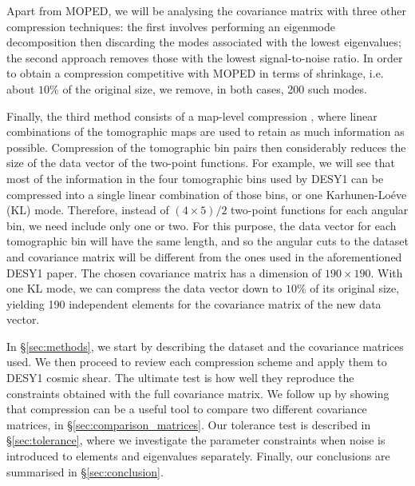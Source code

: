 \documentclass[twocolumn,nofootinbib]{\docclass}
\newcommand{\rsec}[1]{\S\ref{sec:#1}}
\begin{document}
	Apart from MOPED, we will be analysing the covariance matrix with three other compression techniques: the first involves performing an eigenmode decomposition then discarding the modes associated with the lowest eigenvalues; the second approach removes those with the lowest signal-to-noise ratio. In order to obtain a compression competitive with MOPED in terms of shrinkage, i.e. about $10\%$ of the original size, we remove, in both cases, 200 such modes.
	
	Finally, the third method consists of a map-level compression \citep{Alonso:2017hhj}, where linear combinations of the tomographic maps are used to retain as much information as possible. Compression of the tomographic bin pairs then considerably reduces the size of the data vector of the two-point functions. For example, we will see that most of the information in the four tomographic bins used by DESY1 can be compressed into a single linear combination of those bins, or one Karhunen-Lo\'eve (KL) mode. Therefore, instead of $(4\times5)/2$ two-point functions for each angular bin, we need include only one or two.
	For this purpose, the data vector for each tomographic bin will have the same length, and so the angular cuts to the dataset and covariance matrix will be different from the ones used in the aforementioned DESY1 paper. The chosen covariance matrix has a dimension of $190 \times 190$. With one KL mode, we can compress the data vector down to $10\%$ of its original size, yielding 190 independent elements for the covariance matrix of the new data vector.
	
	In \rsec{methods}, we start by describing the dataset and the covariance matrices used. We then proceed to review each compression scheme and apply them to DESY1 cosmic shear.  The ultimate test is how well they reproduce the constraints obtained with the full covariance matrix.
	We follow up by showing that compression can be a useful tool to compare two different covariance matrices, in \rsec{comparison_matrices}.
	Our tolerance test is described in \rsec{tolerance}, where we investigate the parameter constraints when noise is introduced to elements and eigenvalues separately. Finally, our conclusions are summarised in \rsec{conclusion}.
	
\end{document}
